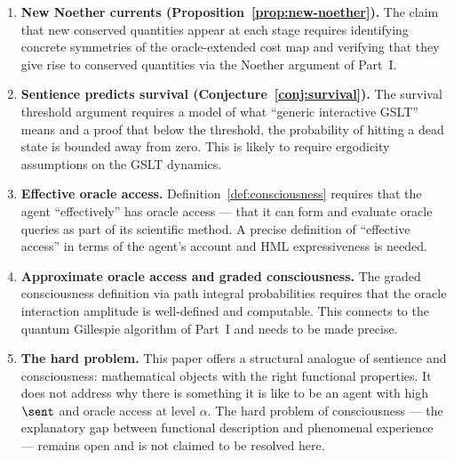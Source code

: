 \begin{enumerate}[label=\textbf{Gap \arabic*.}, leftmargin=*, itemsep=8pt]
  \item \textbf{New Noether currents (Proposition~\ref{prop:new-noether}).}
        The claim that new conserved quantities appear at each
        stage requires identifying concrete symmetries of the
        oracle-extended cost map and verifying that they give
        rise to conserved quantities via the Noether argument of
        Part~I.

  \item \textbf{Sentience predicts survival
        (Conjecture~\ref{conj:survival}).}
        The survival threshold argument requires a model of what
        ``generic interactive GSLT'' means and a proof that below
        the threshold, the probability of hitting a dead state
        is bounded away from zero.
        This is likely to require ergodicity assumptions on the
        GSLT dynamics.

  \item \textbf{Effective oracle access.}
        Definition~\ref{def:consciousness} requires that the agent
        ``effectively'' has oracle access --- that it can form and
        evaluate oracle queries as part of its scientific method.
        A precise definition of ``effective access'' in terms of
        the agent's account and HML expressiveness is needed.

  \item \textbf{Approximate oracle access and graded consciousness.}
        The graded consciousness definition via path integral
        probabilities requires that the oracle interaction amplitude
        is well-defined and computable.
        This connects to the quantum Gillespie algorithm of
        Part~I and needs to be made precise.

  \item \textbf{The hard problem.}
        This paper offers a structural analogue of sentience and
        consciousness: mathematical objects with the right
        functional properties.
        It does not address why there is something it is like to
        be an agent with high $\sent$ and oracle access at level
        $\alpha$.
        The hard problem of consciousness --- the explanatory gap
        between functional description and phenomenal experience
        --- remains open and is not claimed to be resolved here.

\end{enumerate}

